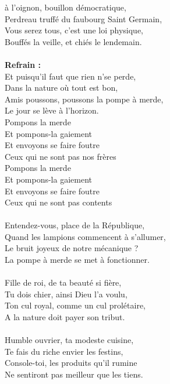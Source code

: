 
 à l'oignon, bouillon démocratique,
\\Perdreau truffé du faubourg Saint Germain,
\\Vous serez tous, c'est une loi physique,
\\Bouffés la veille, et chiés le lendemain.
\\\\\textbf{Refrain :}
\\Et puisqu'il faut que rien n'se perde,
\\Dans la nature où tout est bon,
\\Amis poussons, poussons la pompe à merde,
\\Le jour se lève à l'horizon.
\\Pompons la merde
\\Et pompons-la gaiement
\\Et envoyons se faire foutre
\\Ceux qui ne sont pas nos frères
\\Pompons la merde
\\Et pompons-la gaiement
\\Et envoyons se faire foutre
\\Ceux qui ne sont pas contents
\\\\Entendez-vous, place de la République,
\\Quand les lampions commencent à s'allumer,
\\Le bruit joyeux de notre mécanique ?
\\La pompe à merde se met à fonctionner.
\\\\Fille de roi, de ta beauté si fière,
\\Tu dois chier, ainsi Dieu l'a voulu,
\\Ton cul royal, comme un cul prolétaire,
\\A la nature doit payer son tribut.
\\\\Humble ouvrier, ta modeste cuisine,
\\Te fais du riche envier les festins,
\\Console-toi, les produits qu'il rumine
\\Ne sentiront pas meilleur que les tiens.
